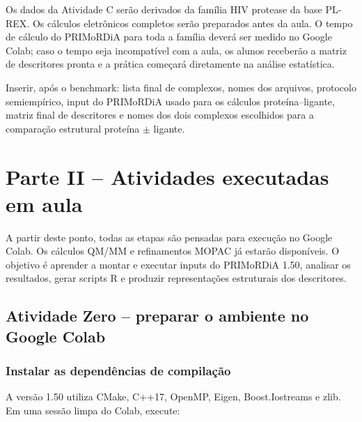 \documentclass[a4paper,11pt]{refart}
\begin{document}
Os dados da Atividade C serão derivados da família HIV protease da base PL-REX. Os cálculos eletrônicos completos serão preparados antes da aula. O tempo de cálculo do PRIMoRDiA para toda a família deverá ser medido no Google Colab; caso o tempo seja incompatível com a aula, os alunos receberão a matriz de descritores pronta e a prática começará diretamente na análise estatística.

\begin{todobox}
Inserir, após o benchmark: lista final de complexos, nomes dos arquivos, protocolo semiempírico, input do PRIMoRDiA usado para os cálculos proteína--ligante, matriz final de descritores e nomes dos dois complexos escolhidos para a comparação estrutural proteína $\pm$ ligante.
\end{todobox}

\newpage

\section{Parte II -- Atividades executadas em aula}

\begin{aulabox}
A partir deste ponto, todas as etapas são pensadas para execução no Google Colab. Os cálculos QM/MM e refinamentos MOPAC já estarão disponíveis. O objetivo é aprender a montar e executar inputs do PRIMoRDiA 1.50, analisar os resultados, gerar scripts R e produzir representações estruturais dos descritores.
\end{aulabox}

\subsection{Atividade Zero -- preparar o ambiente no Google Colab}

\subsubsection{Instalar as dependências de compilação}

A versão 1.50 utiliza CMake, C++17, OpenMP, Eigen, Boost.Iostreams e zlib. Em uma sessão limpa do Colab, execute:
\end{document}
